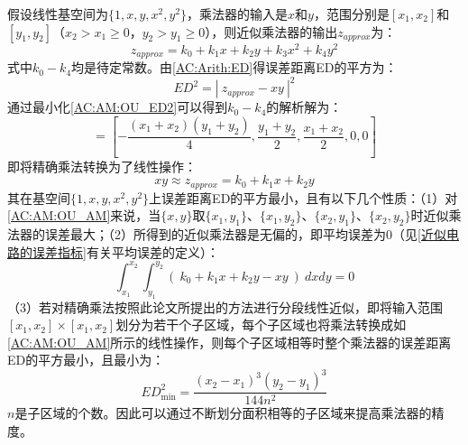 假设线性基空间为$\{1, x, y, x^2, y^2\}$，乘法器的输入是$x$和$y$，范围分别是$[x_1,x_2]$和$[y_1,y_2]$（$x_2 > x_1 \ge 0$，$y_2 > y_1 \ge 0$），则近似乘法器的输出$z_{approx}$为：
\begin{equation}
    z_{approx} = k_0 + k_1 x + k_2 y + k_3 x^2 + k_4 y^2
\end{equation}
式中$k_0-k_4$均是待定常数。由\eqref{AC:Arith:ED}得误差距离ED的平方为：
\begin{equation}
    ED^2 = | \ z_{approx} - xy \ | ^2
\label{AC:AM:OU_ED2}
\end{equation}
通过最小化\eqref{AC:AM:OU_ED2}可以得到$k_0-k_4$的解析解为：
\begin{equation}
    [k_{0}, k_{1}, k_{2}, k_{3}, k_{4}]=[-\frac{(x_{1}+x_{2})(y_{1}+y_{2})}{4},\frac{y_{1}+y_{2}}{2},\frac{x_{1}+x_{2}}{2}, 0,0]
\end{equation}
即将精确乘法转换为了线性操作：
\begin{equation} 
    xy \approx z_{approx} = k_{0}+k_{1}x+k_{2}y
\label{AC:AM:OU_AM}
\end{equation}
其在基空间$\{1, x, y, x^2, y^2\}$上误差距离ED的平方最小，且有以下几个性质：（1）对\eqref{AC:AM:OU_AM}来说，当$\{x,y\}$取$\{x_1,y_1\}$、$\{x_1,y_2\}$、$\{x_2,y_1\}$、$\{x_2,y_2\}$时近似乘法器的误差最大；（2）所得到的近似乘法器是无偏的，即平均误差为0（见\ref{近似电路的误差指标}有关平均误差的定义）：
\begin{equation} 
    \int\nolimits_{x_{1}}^{x_{2}}\int\nolimits_{y_{1}}^{y_{2}} ( \ k_{0}+k_{1}x+k_{2}y - xy \ ) \ dxdy = 0
\end{equation}
（3）若对精确乘法按照此论文所提出的方法进行分段线性近似，即将输入范围$[x_1,x_2] \times [x_1,x_2]$划分为若干个子区域，每个子区域也将乘法转换成如\eqref{AC:AM:OU_AM}所示的线性操作，则每个子区域相等时整个乘法器的误差距离ED的平方最小，且最小为：
\begin{equation}
    ED^2_\text{min} = \dfrac{ (x_2 - x_1)^3 (y_2 - y_1)^3 }{144 n^2}
\end{equation}
$n$是子区域的个数。因此可以通过不断划分面积相等的子区域来提高乘法器的精度。

